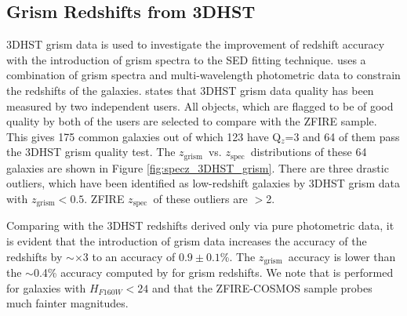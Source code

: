 \documentclass[iop]{emulateapj}
\newcommand{\around}{$\sim$}
\newcommand{\zspec}{$z_{\mathrm{spec}}$}
\newcommand{\zgrism}{$z_{\mathrm{grism}}$}
\begin{document}
\subsection{Grism Redshifts from 3DHST}


3DHST grism data is used to investigate the improvement of redshift accuracy with the introduction of grism spectra to the SED fitting technique. \citet{Momcheva2015} uses a combination of grism spectra and multi-wavelength photometric data to constrain the redshifts of the galaxies. 
\citet{Momcheva2015} states that 3DHST grism data quality has been measured by two independent users. All objects, which are flagged to be of good quality by both of the users are selected to compare with the ZFIRE sample. 
This gives 175 common galaxies out of which 123 have Q$_{z}$=3 and 64 of them pass the 3DHST grism quality test.
The \zgrism\ vs. \zspec\ distributions of these 64 galaxies are shown in Figure \ref{fig:specz_3DHST_grism}.  
There are three drastic outliers, which have been identified as low-redshift galaxies by 3DHST grism data with \zgrism$<0.5$. ZFIRE \zspec\ of these outliers are $>$2. 



Comparing with the 3DHST redshifts derived only via pure photometric data, it is evident that the introduction of grism data increases the accuracy of the redshifts by \around$\times$3 to an accuracy of $0.9\pm0.1$\%.  The \zgrism\ accuracy is lower than the \around0.4\% accuracy computed by \citet{Bezanson2016} for grism redshifts. We note that \citet{Bezanson2016} is performed for galaxies with $H_{F160W}<24$ and that the ZFIRE-COSMOS sample probes much fainter magnitudes. 
\end{document}
